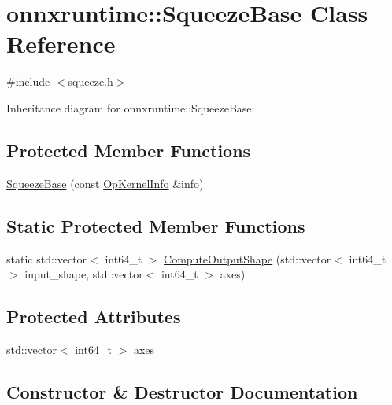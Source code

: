 \hypertarget{classonnxruntime_1_1SqueezeBase}{}\section{onnxruntime\+:\+:Squeeze\+Base Class Reference}
\label{classonnxruntime_1_1SqueezeBase}


{\ttfamily \#include $<$squeeze.\+h$>$}



Inheritance diagram for onnxruntime\+:\+:Squeeze\+Base\+:
\subsection*{Protected Member Functions}
\begin{DoxyCompactItemize}
\item 
\mbox{\hyperlink{classonnxruntime_1_1SqueezeBase_ac1804ca67c2512317099918c3ea903c2}{Squeeze\+Base}} (const \mbox{\hyperlink{classonnxruntime_1_1OpKernelInfo}{Op\+Kernel\+Info}} \&info)
\end{DoxyCompactItemize}
\subsection*{Static Protected Member Functions}
\begin{DoxyCompactItemize}
\item 
static std\+::vector$<$ int64\+\_\+t $>$ \mbox{\hyperlink{classonnxruntime_1_1SqueezeBase_ac227d352a3342d4bf132384bbef59e33}{Compute\+Output\+Shape}} (std\+::vector$<$ int64\+\_\+t $>$ input\+\_\+shape, std\+::vector$<$ int64\+\_\+t $>$ axes)
\end{DoxyCompactItemize}
\subsection*{Protected Attributes}
\begin{DoxyCompactItemize}
\item 
std\+::vector$<$ int64\+\_\+t $>$ \mbox{\hyperlink{classonnxruntime_1_1SqueezeBase_ade1fb6d5533768e91964993de22e84bb}{axes\+\_\+}}
\end{DoxyCompactItemize}


\subsection{Constructor \& Destructor Documentation}
\mbox{\label{classonnxruntime_1_1SqueezeBase_ac1804ca67c2512317099918c3ea903c2}} 
